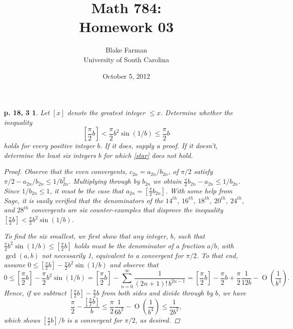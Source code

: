 \documentclass[10pt]{amsart}
\author{Blake Farman\\University of South Carolina}
\title{Math 784:\\Homework 03}
\date{October 5, 2012}
\newcommand{\BigO}[1]{\operatorname{O}\left(#1\right)}
\begin{document}
\maketitle

\newtheorem*{ex1}{p. 18, 3}
\newtheorem*{ex2}{p. 36, 2}
\newtheorem{lem}{Lemma}

\begin{ex1}
  Let $\left[x\right]$ denote the greatest integer $\leq x$.
  Determine whether the inequality
  \begin{equation}\label{star}\tag{$\ast$}
    \left[\frac{\pi}{2}b\right] < \frac{\pi}{2}b^2\sin(1/b) \leq \frac{\pi}{2}b
  \end{equation}
  holds for every positive integer $b$.
  If it does, supply a proof.
  If it doesn't, determine the least six integers $b$ for which \eqref{star} does not hold.
  \begin{proof}
    Observe that the even convergents, $c_{2n} = a_{2n}/b_{2n}$, of $\pi/2$ satisfy  $\pi/2 - a_{2n}/b_{2n} \leq 1/b_{2n}^2$.
    Multiplying through by $b_{2n}$ we obtain $\frac{\pi}{2}b_{2n} - a_{2n} \leq 1/b_{2n}$.
    Since $1/b_{2n} \leq 1$, it must be the case that $a_{2n} = \left[\frac{\pi}{2}b_{2n}\right]$.
    With some help from Sage, it is easily verified that the denominators of the $14^{th}$, $16^{th}$, $18^{th}$, $20^{th}$, $24^{th}$, and $28^{th}$ convergents are six counter-examples that disprove the inequality $\left[\frac{\pi}{2}b\right] < \frac{\pi}{2}b^2\sin(1/b)$.
    
    To find the six smallest, we first show that any integer, $b$, such that $\frac{\pi}{2}b^2\sin(1/b) \leq [\frac{\pi}{2}b]$ holds must be the denominator of a fraction $a/b$, with $\gcd(a,b)$ not necessarily 1, equivalent to a convergent for $\pi/2$.
    To that end, assume $0 \leq \left[\frac{\pi}{2}b\right] - \frac{\pi}{2}b^2\sin(1/b)$ and  observe that 
    $$0 \leq \left[ \frac{\pi}{2}b \right] - \frac{\pi}{2}b^2\sin(1/b) = \left[ \frac{\pi}{2}b \right] - \sum_{n=0}^{\infty} \frac{1}{(2n+1)!\,b^{2n-1}} = \left[\frac{\pi}{2}b\right] - \frac{\pi}{2}b + \frac{\pi}{2}\frac{1}{12b} - \BigO{\frac{1}{b^3}}.$$
    Hence, if we subtract $\left[\frac{\pi}{2}b\right] - \frac{\pi}{2}b$ from both sides and divide through by $b$, we have
    $$\frac{\pi}{2} - \frac{\left[\frac{\pi}{2}b\right]}{b} \leq \frac{\pi}{2}\frac{1}{6b^2} - \BigO{\frac{1}{b^4}} \leq \frac{1}{2b^2},$$
    which shows $\left[\frac{\pi}{2}b\right]/b$ is a convergent for $\pi/2$, as desired.
    

\end{proof}
\end{ex1}
\end{document}
